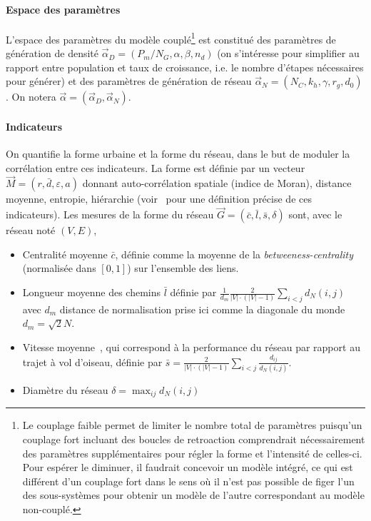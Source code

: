 \paragraph{Espace des paramètres}

L'espace des paramètres du modèle couplé\footnote{Le couplage faible permet de limiter le nombre total de paramètres puisqu'un couplage fort incluant des boucles de retroaction comprendrait nécessairement des paramètres supplémentaires pour régler la forme et l'intensité de celles-ci. Pour espérer le diminuer, il faudrait concevoir un modèle intégré, ce qui est différent d'un couplage fort dans le sens où il n'est pas possible de figer l'un des sous-systèmes pour obtenir un modèle de l'autre correspondant au modèle non-couplé.} est constitué des paramètres de génération de densité $\vec{\alpha}_D = (P_m/N_G , \alpha,\beta , n_d)$ (on s'intéresse pour simplifier au rapport entre population et taux de croissance, i.e. le nombre d'étapes nécessaires pour générer) et des paramètres de génération de réseau $\vec{\alpha}_N=(N_C,k_h,\gamma , r_g , d_0)$. On notera $\vec{\alpha} = (\vec{\alpha}_D,\vec{\alpha}_N)$.

\paragraph{Indicateurs}

On quantifie la forme urbaine et la forme du réseau, dans le but de moduler la corrélation entre ces indicateurs. La forme est définie par un vecteur $\vec{M}=(r,\bar{d},\varepsilon,a)$ donnant auto-corrélation spatiale (indice de Moran), distance moyenne, entropie, hiérarchie (voir~\cite{le2015forme} pour une définition précise de ces indicateurs). Les mesures de la forme du réseau $\vec{G} = (\bar{c},\bar{l},\bar{s},\delta)$ sont, avec le réseau noté $(V,E)$,
\begin{itemize}
\item Centralité moyenne $\bar{c}$, définie comme la moyenne de la \emph{betweeness-centrality} (normalisée dans $[0,1]$) sur l'ensemble des liens.
\item Longueur moyenne des chemins $\bar{l}$ définie par $\frac{1}{d_m}\frac{2}{|V|\cdot (|V|-1)}\sum_{i<j}d_N(i,j)$ avec $d_m$ distance de normalisation prise ici comme la diagonale du monde $d_m=\sqrt{2}N$.
\item Vitesse moyenne~\cite{banos2012towards}, qui correspond à la performance du réseau par rapport au trajet à vol d'oiseau, définie par $\bar{s} = \frac{2}{|V|\cdot (|V|-1)}\sum_{i<j}{\frac{d_{ij}}{d_N(i,j)}}$.
\item Diamètre du réseau $\delta = \max_{ij}d_N(i,j)$
\end{itemize}

